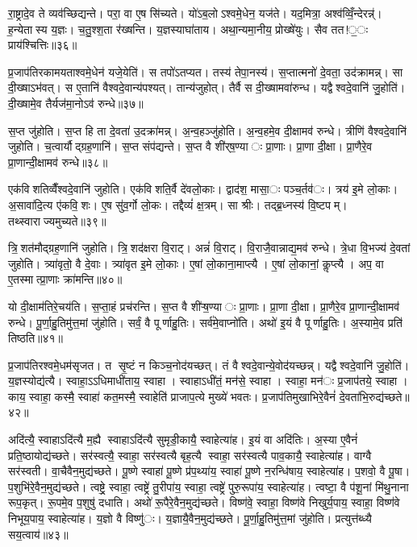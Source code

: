 रा॒ष्ट्रादे॒व ते व्यव॑च्छिद्यन्ते। परा॒ वा ए॒ष सि॑च्यते। यो॑ऽब॒लोऽश्वमे॒धेन॒ यज॑ते। यद॒मित्रा॒ अश्व॑व्विँ॒न्देरन्न्॑। ह॒न्येतास्य य॒ज्ञः। च॒तु॒श्श॒ता र॑ख्षन्ति। य॒ज्ञस्याघा॑ताय। अथा॒न्यमा॒नीय॒ प्रोख्षे॑युः। सैव तत!॒ः प्राय॑श्चित्तिः॥३६॥


प्र॒जाप॑तिरकामयताश्वमे॒धेन॑ यजे॒येति॑। स तपो॑ऽतप्यत। तस्य॑ तेपा॒नस्य॑। स॒प्तात्मनो॑ दे॒वता॒ उद॑क्रामन्न्। सा दी॒ख्षाऽभ॑वत्। स ए॒तानि॑ वैश्वदे॒वान्य॑पश्यत्। तान्य॑जुहोत्। तैर्वै स दी॒ख्षामवा॑रुन्ध। यद्वैश्वदे॒वानि॑ जु॒होति॑। दी॒ख्षामे॒व तैर्यज॑मा॒नोऽव॑ रुन्धे॥३७॥

स॒प्त जु॑होति। स॒प्त हि ता दे॒वता॑ उ॒दक्रा॑मन्न्। अ॒न्व॒हञ्जु॑होति। अ॒न्व॒हमे॒व दी॒क्षामव॑ रुन्धे। त्रीणि॑ वैश्वदे॒वानि॑ जुहोति। च॒त्वार्यौद्ग्रह॒णानि॑। स॒प्त संप॑द्यन्ते। स॒प्त वै शी॑र्‌ष॒ण्याः प्रा॒णाः। प्रा॒णा दी॒क्षा। प्रा॒णैरे॒व प्रा॒णान्दी॒क्षामव॑ रुन्धे॥३८॥

एक॑विशतिव्वैँश्वदे॒वानि॑ जुहोति। एक॑विशति॒र्वै दे॑वलो॒काः। द्वाद॑श॒ मासा॒ः पञ्च॒र्तव॑ः। त्रय॑ इ॒मे लो॒काः। अ॒सावा॑दि॒त्य ए॑कवि॒शः। ए॒ष सु॑व॒र्गो लो॒कः। तद्दैव्यं॑ क्ष॒त्रम्। सा श्रीः। तद्ब्र॒ध्नस्य॑ वि॒ष्टपम्। तथ्स्वाराज्यमुच्यते॥३९॥

त्रि॒शत॑मौद्ग्रह॒णानि॑ जुहोति। त्रि॒शद॑क्षरा वि॒राट्। अन्नं॑ वि॒राट्। वि॒राजै॒वान्नाद्य॒मव॑ रुन्धे। त्रे॒धा वि॒भज्य॑ दे॒वतां जुहोति। त्र्या॑वृतो॒ वै दे॒वाः। त्र्या॑वृत इ॒मे लो॒काः। ए॒षां लो॒काना॒माप्त्यै। ए॒षां लो॒कानां॒ कॢप्त्यै। अप॒ वा ए॒तस्मात्प्रा॒णाः क्रा॑मन्ति॥४०॥

यो दी॒क्षाम॑तिरे॒चय॑ति। स॒प्ता॒हं प्रच॑रन्ति। स॒प्त वै शी॑ऱ्ष॒ण्याः प्रा॒णाः। प्रा॒णा दी॒क्षा। प्रा॒णैरे॒व प्रा॒णान्दी॒क्षामव॑ रुन्धे। पू॒र्णा॒हु॒तिमु॑त्त॒मां जु॑होति। सर्वं॒ वै पूर्णाहु॒तिः। सर्व॑मे॒वाप्नो॑ति। अथो॑ इ॒यं वै पूर्णाहु॒तिः। अ॒स्यामे॒व प्रति॑ तिष्ठति॥४१॥


प्र॒जाप॑तिरश्वमे॒धम॑सृजत। त सृ॒ष्टं न किञ्च॒नोद॑यच्छत्। तं वैश्वदे॒वान्ये॒वोद॑यच्छन्न्। यद्वैश्वदे॒वानि॑ जु॒होति॑। य॒ज्ञस्योद्य॑त्यै। स्वाहा॒ऽऽधिमाधी॑ताय॒ स्वाहा। स्वाहाऽधी॑तं॒ मन॑से॒ स्वाहा। स्वाहा॒ मन॑ः प्र॒जाप॑तये॒ स्वाहा। काय॒ स्वाहा॒ कस्मै॒ स्वाहा॑ कत॒मस्मै॒ स्वाहेति॑ प्राजाप॒त्ये मुख्ये॑ भवतः। प्र॒जाप॑तिमुखाभिरे॒वैनं॑ दे॒वता॑भि॒रुद्य॑च्छते॥४२॥

अदि॑त्यै॒ स्वाहाऽदि॑त्यै म॒ह्यै स्वाहाऽदि॑त्यै सुमृडी॒कायै॒ स्वाहेत्या॑ह। इ॒यं वा अदि॑तिः। अ॒स्या ए॒वैनं॑ प्रति॒ष्ठायोद्य॑च्छते। सर॑स्वत्यै॒ स्वाहा॒ सर॑स्वत्यै बृह॒त्यै स्वाहा॒ सर॑स्वत्यै पाव॒कायै॒ स्वाहेत्या॑ह। वाग्वै सर॑स्वती। वा॒चैवैन॒मुद्य॑च्छते। पू॒ष्णे स्वाहा॑ पू॒ष्णे प्र॑प॒थ्या॑य॒ स्वाहा॑ पू॒ष्णे न॒रन्धि॑षाय॒ स्वाहेत्या॑ह। प॒शवो॒ वै पू॒षा। प॒शुभि॑रे॒वैन॒मुद्य॑च्छते। त्वष्ट्रे॒ स्वाहा॒ त्वष्ट्रे॑ तु॒रीपा॑य॒ स्वाहा॒ त्वष्ट्रे॑ पुरु॒रूपा॑य॒ स्वाहेत्या॑ह। त्वष्टा॒ वै प॑शू॒नां मि॑थु॒नाना रूप॒कृत्। रू॒पमे॒व प॒शुषु॑ दधाति। अथो॑ रू॒पैरे॒वैन॒मुद्य॑च्छते। विष्ण॑वे॒ स्वाहा॒ विष्ण॑वे निखुर्य॒पाय॒ स्वाहा॒ विष्ण॑वे निभूय॒पाय॒ स्वाहेत्या॑ह। य॒ज्ञो वै विष्णु॑ः। य॒ज्ञायै॒वैन॒मुद्य॑च्छते। पू॒र्णा॒हु॒तिमु॑त्त॒मां जु॑होति। प्रत्युत्त॑ब्ध्यै सय॒त्वाय॑॥४३॥

